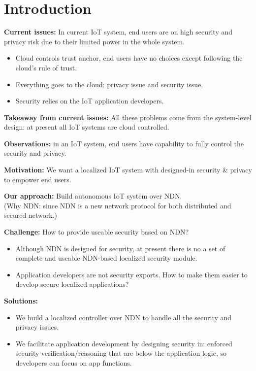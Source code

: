 \section{Introduction}

\textbf{Current issues:} In current IoT system, end users are on high security and privacy risk due to their limited power in the whole system.
\begin{itemize}
	\item Cloud controls trust anchor, end users have no choices except following the cloud's rule of trust. 
	\item Everything goes to the cloud: privacy issue and security issue.
	\item Security relies on the IoT application developers.
\end{itemize}

\textbf{Takeaway from current issues:} All these problems come from the system-level design: at present all IoT systems are cloud controlled.

\textbf{Observations:} in an IoT system, end users have capability to fully control the security and privacy.

\textbf{Motivation:} We want a localized IoT system with designed-in security \& privacy to empower end users.

\textbf{Our approach:} Build autonomous IoT system over NDN. \\
(Why NDN: since NDN is a new network protocol for both distributed and secured network.)

\textbf{Challenge:} How to provide useable security based on NDN?
\begin{itemize}
	\item Although NDN is designed for security, at present there is no a set of complete and useable NDN-based localized security module.
	\item Application developers are not security exports. How to make them easier to develop secure localized applications?
\end{itemize}

\textbf{Solutions:}
\begin{itemize}
	\item We build a localized controller over NDN to handle all the security and privacy issues.
	\item We facilitate application development by designing security in: enforced security verification/reasoning that are below the application logic, so developers can focus on app functions.
\end{itemize}

